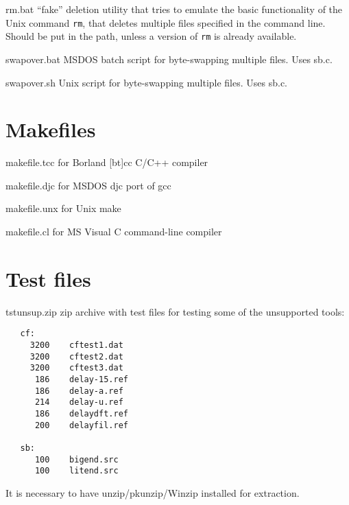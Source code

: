 \begin{Descr}{40mm}
\item[rm.bat]
                ``fake'' deletion utility that tries to emulate the
        basic functionality of the Unix command {\tt rm}, that
        deletes multiple files specified in the command
        line. Should be put in the path, unless
        a version of {\tt rm} is already available.
\item[swapover.bat]
                MSDOS batch script for byte-swapping multiple
                files. Uses sb.c.
\item[swapover.sh]
                Unix script for byte-swapping multiple files. Uses sb.c.
\end{Descr}

\section{Makefiles}

\begin{Descr}{40mm}
\item[makefile.tcc] for Borland [bt]cc C/C++ compiler
\item[makefile.djc] for MSDOS djc port of gcc
\item[makefile.unx] for Unix make
\item[makefile.cl]      for MS Visual C command-line compiler
\end{Descr}


\section{Test files}

\begin{Descr}{40mm}
\item[tstunsup.zip]
                zip archive with test files for testing some of the
                unsupported tools: \\
        {\tt\begin{verbatim}
   cf:
     3200    cftest1.dat
     3200    cftest2.dat
     3200    cftest3.dat
      186    delay-15.ref
      186    delay-a.ref
      214    delay-u.ref
      186    delaydft.ref
      200    delayfil.ref

   sb:
      100    bigend.src
      100    litend.src

        \end{verbatim}}
                It is necessary to have unzip/pkunzip/Winzip installed
                for extraction.
\end{Descr}
